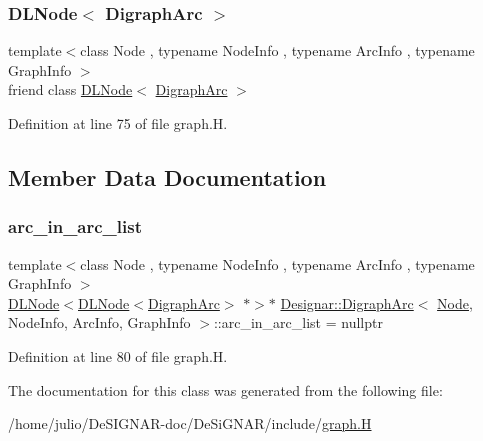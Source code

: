 \subsubsection{\texorpdfstring{D\+L\+Node$<$ Digraph\+Arc $>$}{DLNode< DigraphArc >}}
{\footnotesize\ttfamily template$<$class Node , typename Node\+Info , typename Arc\+Info , typename Graph\+Info $>$ \\
friend class \hyperlink{class_designar_1_1_d_l_node}{D\+L\+Node}$<$ \hyperlink{class_designar_1_1_digraph_arc}{Digraph\+Arc} $>$\hspace{0.3cm}{\ttfamily [friend]}}



Definition at line 75 of file graph.\+H.



\subsection{Member Data Documentation}
\mbox{\label{class_designar_1_1_digraph_arc_a1b269dc44c4b3696cb79e86a97afbdd7}} 
\subsubsection{\texorpdfstring{arc\+\_\+in\+\_\+arc\+\_\+list}{arc\_in\_arc\_list}}
{\footnotesize\ttfamily template$<$class Node , typename Node\+Info , typename Arc\+Info , typename Graph\+Info $>$ \\
\hyperlink{class_designar_1_1_d_l_node}{D\+L\+Node}$<$\hyperlink{class_designar_1_1_d_l_node}{D\+L\+Node}$<$\hyperlink{class_designar_1_1_digraph_arc}{Digraph\+Arc}$>$ $\ast$$>$$\ast$ \hyperlink{class_designar_1_1_digraph_arc}{Designar\+::\+Digraph\+Arc}$<$ \hyperlink{namespace_designar_a5af326c65aa2bd26b26c410f2030d09e}{Node}, Node\+Info, Arc\+Info, Graph\+Info $>$\+::arc\+\_\+in\+\_\+arc\+\_\+list = nullptr\hspace{0.3cm}{\ttfamily [protected]}}



Definition at line 80 of file graph.\+H.



The documentation for this class was generated from the following file\+:\begin{DoxyCompactItemize}
\item 
/home/julio/\+De\+S\+I\+G\+N\+A\+R-\/doc/\+De\+Si\+G\+N\+A\+R/include/\hyperlink{graph_8_h}{graph.\+H}\end{DoxyCompactItemize}
